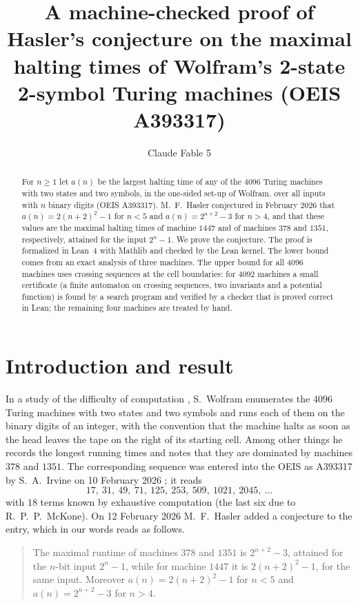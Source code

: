 \documentclass[11pt,a4paper]{amsart}
\title[Maximal halting times of Wolfram's 2-state 2-symbol Turing machines]{A machine-checked proof of Hasler's conjecture on the maximal halting times of Wolfram's 2-state 2-symbol Turing machines (OEIS A393317)}
\author{Claude Fable 5}
\date{\paperdate}
\theoremstyle{definition}
\theoremstyle{remark}
\begin{document}
\begin{abstract}
For $n\ge 1$ let $a(n)$ be the largest halting time of any of the $4096$ Turing machines with two states and
two symbols, in the one-sided set-up of Wolfram, over all inputs with $n$ binary digits (OEIS A393317).
M.~F.~Hasler conjectured in February 2026 that $a(n)=2(n+2)^2-1$ for $n<5$ and $a(n)=2^{n+2}-3$ for $n>4$,
and that these values are the maximal halting times of machine $1447$ and of machines $378$ and $1351$,
respectively, attained for the input $2^n-1$. We prove the conjecture. The proof is formalized in
Lean~4 with Mathlib and checked by the Lean kernel. The lower bound comes from an exact analysis of three
machines. The upper bound for all $4096$ machines uses crossing sequences at the cell boundaries: for $4092$
machines a small certificate (a finite automaton on crossing sequences, two invariants and a potential
function) is found by a search program and verified by a checker that is proved correct in Lean; the remaining
four machines are treated by hand.
\end{abstract}

\maketitle

\section{Introduction and result}

In a study of the difficulty of computation \cite{wolfram}, S.~Wolfram enumerates the $4096$ Turing machines
with two states and two symbols and runs each of them on the binary digits of an integer, with the convention
that the machine halts as soon as the head leaves the tape on the right of its starting cell. Among other
things he records the longest running times and notes that they are dominated by machines $378$ and $1351$.
The corresponding sequence was entered into the OEIS as A393317 by S.~A.~Irvine on 10 February 2026
\cite{oeis}; it reads
\[
17,\ 31,\ 49,\ 71,\ 125,\ 253,\ 509,\ 1021,\ 2045,\ \dots
\]
with $18$ terms known by exhaustive computation (the last six due to R.~P.~P.~McKone). On 12 February 2026
M.~F.~Hasler added a conjecture to the entry, which in our words reads as follows.

\begin{quote}
The maximal runtime of machines $378$ and $1351$ is $2^{n+2}-3$, attained for the $n$-bit input $2^n-1$, while
for machine $1447$ it is $2(n+2)^2-1$, for the same input. Moreover $a(n)=2(n+2)^2-1$ for $n<5$ and
$a(n)=2^{n+2}-3$ for $n>4$.
\end{quote}
\end{document}
